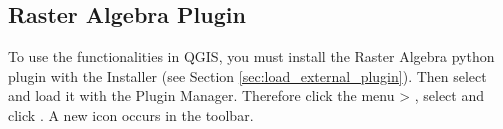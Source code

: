 \subsection{Raster Algebra Plugin}\label{sec:ftools}

\updatedisclaimer




To use the functionalities in QGIS, you must install the Raster Algebra 
python plugin with the  Installer 
(see Section \ref{sec:load_external_plugin}). Then select and load it 
with the Plugin Manager. Therefore click the menu  > 
, select  and click 
. A new  icon occurs 
in the toolbar.

